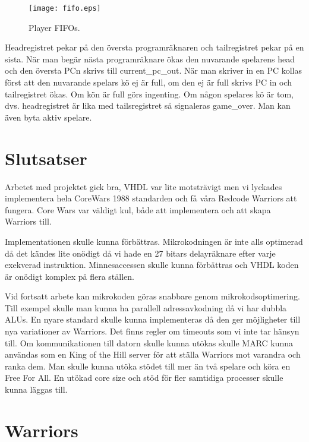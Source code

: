 \documentclass[11pt]{article}
\begin{document}
\begin{figure}[h]
    \begin{center}
        \texttt{[image: fifo.eps]}
        \caption{Player FIFOs.}
        \label{fig:fifo}
    \end{center}
\end{figure}

Headregistret pekar på den översta programräknaren och tailregistret pekar på en sista. När man begär nästa programräknare ökas den nuvarande spelarens head och den översta PCn skrivs till current\_pc\_out. När man skriver in en PC kollas först att den nuvarande spelars kö ej är full, om den ej är full skrivs PC in och tailregistret ökas. Om kön är full görs ingenting. Om någon spelares kö är tom, dvs. headregistret är lika med tailsregistret så signaleras game\_over. Man kan även byta aktiv spelare.


\newpage

\section{Slutsatser}

Arbetet med projektet gick bra, VHDL var lite motsträvigt men vi lyckades implementera hela CoreWars 1988 standarden och få våra Redcode Warriors att fungera. Core Wars var väldigt kul, både att implementera och att skapa Warriors till.

Implementationen skulle kunna förbättras. Mikrokodningen är inte alls optimerad då det kändes lite onödigt då vi hade en 27 bitars delayräknare efter varje exekverad instruktion. Minnesaccessen skulle kunna förbättras och VHDL koden är onödigt komplex på flera ställen.

Vid fortsatt arbete kan mikrokoden göras snabbare genom mikrokodsoptimering. Till exempel skulle man kunna ha parallell adressavkodning då vi har dubbla ALUs. En nyare standard skulle kunna implementeras då den ger möjligheter till nya variationer av Warriors. Det finns regler om timeouts som vi inte tar hänsyn till. Om kommunikationen till datorn skulle kunna utökas skulle MARC kunna användas som en King of the Hill server för att ställa Warriors mot varandra och ranka dem. Man skulle kunna utöka stödet till mer än två spelare och köra en Free For All. En utökad core size och stöd för fler samtidiga processer skulle kunna läggas till.

\newpage

\appendix
\section{Warriors}
\end{document}
